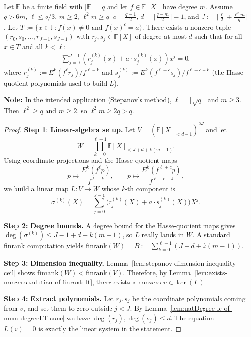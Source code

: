 \begin{lemma}\label{lem:stepanov-system-has-solution} \leanok {}
  Let $\mathbb{F}$ be a finite field with $|\mathbb{F}| = q$ and let $f \in \mathbb{F}[X]$ have degree $m$. Assume $q > 6m$, $\ell \leq q/3$, $m \geq 2$, $\ell^2 m \geq q$, $c = \frac{q-1}{2}$, $d = \lceil\frac{q-m}{2}\rceil - 1$, and $J := \lceil\frac{\ell}{2} + \frac{\ell^2 m}{q}\rceil$. Let $T := \{x \in \mathbb{F} : f(x) \neq 0 \text{ and } f(x)^c = a\}$. There exists a nonzero tuple $(r_0, s_0, \ldots, r_{J-1}, s_{J-1})$ with $r_j, s_j \in \mathbb{F}[X]$ of degree at most $d$ such that for all $x \in T$ and all $k < \ell$:
  \begin{align*}
    \sum_{j=0}^{J-1} \left( r_j^{(k)}(x) + a \cdot s_j^{(k)}(x) \right) x^j = 0,
  \end{align*}
  where $r_j^{(k)} := E^k(f^\ell r_j)/f^{\ell-k}$ and $s_j^{(k)} := E^k(f^{\ell+c} s_j)/f^{\ell+c-k}$ (the Hasse-quotient polynomials used to build $L$).

  \textbf{Note:} In the intended application (Stepanov's method), $\ell = \lceil\sqrt{q}\rceil$ and $m \geq 3$. Then $\ell^2 \geq q$ and $m \geq 2$, so $\ell^2 m \geq 2q > q$.
\end{lemma}
\begin{proof} \leanok
  \textbf{Step 1: Linear-algebra setup.} Let $V = (\mathbb{F}[X]_{< d+1})^{2J}$ and let
  \[
    W = \prod_{k=0}^{\ell-1} \mathbb{F}[X]_{< J + d + k(m-1)}.
  \]
  Using coordinate projections and the Hasse-quotient maps
  \[
    p \mapsto \frac{E^k(f^\ell p)}{f^{\ell-k}}, \qquad
    p \mapsto \frac{E^k(f^{\ell+c} p)}{f^{\ell+c-k}},
  \]
  we build a linear map $L : V \to W$ whose $k$-th component is
  \[
    \sigma^{(k)}(X) = \sum_{j=0}^{J-1} \big(r_j^{(k)}(X) + a \cdot s_j^{(k)}(X)\big) X^j.
  \]

  \textbf{Step 2: Degree bounds.} A degree bound for the Hasse-quotient maps gives
  $\deg(\sigma^{(k)}) \leq J-1 + d + k(m-1)$, so $L$ really lands in $W$.
  A standard finrank computation yields $\mathrm{finrank}(W) = B := \sum_{k=0}^{\ell-1}(J + d + k(m-1))$.

  \textbf{Step 3: Dimension inequality.} Lemma~\ref{lem:stepanov-dimension-inequality-ceil}
  shows $\mathrm{finrank}(W) < \mathrm{finrank}(V)$.
  Therefore, by Lemma~\ref{lem:exists-nonzero-solution-of-finrank-lt}, there exists a nonzero
  $v \in \ker(L)$.

  \textbf{Step 4: Extract polynomials.} Let $r_j, s_j$ be the coordinate polynomials coming
  from $v$, and set them to zero outside $j < J$. By
  Lemma~\ref{lem:natDegree-le-of-mem-degreeLT-succ} we have $\deg(r_j), \deg(s_j) \leq d$.
  The equation $L(v)=0$ is exactly the linear system in the statement.
\end{proof}

